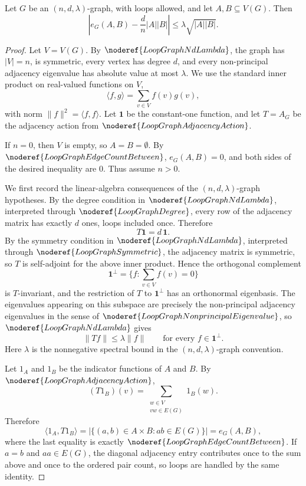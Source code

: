 \begin{lemma}
Let \(G\) be an \((n,d,\lambda)\)-graph, with loops allowed, and let \(A,B\subseteq V(G)\). Then
\[
  \left|e_G(A,B)-\frac d n |A||B|\right|
    \le \lambda\sqrt{|A||B|}.
\]
\end{lemma}
\begin{proof}
Let \(V=V(G)\). By \(\noderef{LoopGraphNdLambda}\), the graph has \(|V|=n\), is symmetric, every vertex has degree \(d\), and every non-principal adjacency eigenvalue has absolute value at most \(\lambda\). We use the standard inner product on real-valued functions on \(V\),
\[
  \langle f,g\rangle=\sum_{v\in V} f(v)g(v),
\]
with norm \(\|f\|^2=\langle f,f\rangle\). Let \(\mathbf 1\) be the constant-one function, and let \(T=A_G\) be the adjacency action from \(\noderef{LoopGraphAdjacencyAction}\).

If \(n=0\), then \(V\) is empty, so \(A=B=\emptyset\). By \(\noderef{LoopGraphEdgeCountBetween}\), \(e_G(A,B)=0\), and both sides of the desired inequality are \(0\). Thus assume \(n>0\).

We first record the linear-algebra consequences of the \((n,d,\lambda)\)-graph hypotheses. By the degree condition in \(\noderef{LoopGraphNdLambda}\), interpreted through \(\noderef{LoopGraphDegree}\), every row of the adjacency matrix has exactly \(d\) ones, loops included once. Therefore
\[
  T\mathbf 1=d\,\mathbf 1. \tag{1}
\]
By the symmetry condition in \(\noderef{LoopGraphNdLambda}\), interpreted through \(\noderef{LoopGraphSymmetric}\), the adjacency matrix is symmetric, so \(T\) is self-adjoint for the above inner product. Hence the orthogonal complement
\[
  \mathbf 1^\perp=\{f:\sum_{v\in V}f(v)=0\}
\]
is \(T\)-invariant, and the restriction of \(T\) to \(\mathbf 1^\perp\) has an orthonormal eigenbasis. The eigenvalues appearing on this subspace are precisely the non-principal adjacency eigenvalues in the sense of \(\noderef{LoopGraphNonprincipalEigenvalue}\), so \(\noderef{LoopGraphNdLambda}\) gives
\[
  \|Tf\|\le \lambda\|f\|
  \qquad\text{for every }f\in\mathbf 1^\perp. \tag{2}
\]
Here \(\lambda\) is the nonnegative spectral bound in the \((n,d,\lambda)\)-graph convention.

Let \(1_A\) and \(1_B\) be the indicator functions of \(A\) and \(B\). By \(\noderef{LoopGraphAdjacencyAction}\),
\[
  (T1_B)(v)=\sum_{\substack{w\in V\\ vw\in E(G)}}1_B(w).
\]
Therefore
\[
  \langle 1_A,T1_B\rangle
  =
  |\{(a,b)\in A\times B:ab\in E(G)\}|
  =
  e_G(A,B), \tag{3}
\]
where the last equality is exactly \(\noderef{LoopGraphEdgeCountBetween}\). If \(a=b\) and \(aa\in E(G)\), the diagonal adjacency entry contributes once to the sum above and once to the ordered pair count, so loops are handled by the same identity.


\end{proof}
